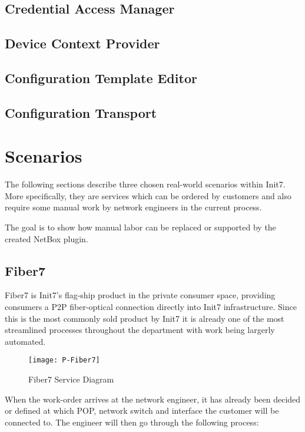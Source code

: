\subsection{Credential Access Manager}



\subsection{Device Context Provider}

\subsection{Configuration Template Editor}

\subsection{Configuration Transport}



\section{Scenarios}

The following sections describe three chosen real-world scenarios within Init7.
More specifically, they are services which can be ordered by customers and also
require some manual work by network engineers in the current process.

The goal is to show how manual labor can be replaced or supported by the
created NetBox plugin.

\subsection{Fiber7}

Fiber7 is Init7's flag-ship product in the private consumer space,
providing consumers a \acrshort{P2P} fiber-optical connection directly into
Init7 infrastructure. Since this is the most commonly sold product by Init7
it is already one of the most streamlined processes throughout the department
with work being largerly automated.

\begin{figure}[h]
  \centering
  \texttt{[image: P-Fiber7]}
  \caption{Fiber7 Service Diagram}
  \label{fig:fiber7}
\end{figure}

When the work-order arrives at the network engineer, it has already been decided
or defined at which \acrshort{POP}, network switch and interface the customer
will be connected to. The engineer will then go through the following process:

